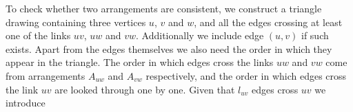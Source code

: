To check whether two arrangements are consistent, we construct a triangle drawing containing three vertices \(u\), \(v\) and \(w\), and all the edges crossing at least one of the links \(uv\), \(uw\) and \(vw\). Additionally we include edge \((u, v)\) if such exists. Apart from the edges themselves we also need the order in which they appear in the triangle. The order in which edges cross the links \(uw\) and \(vw\) come from arrangements \(A_{uw}\) and \(A_{vw}\) respectively, and the order in which edges cross the link \(uv\) are looked through one by one. Given that \(l_{uv}\) edges cross \(uv\) we introduce

